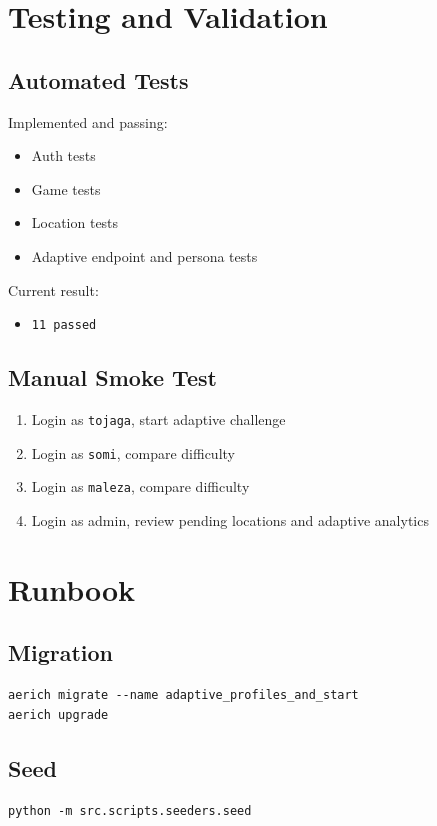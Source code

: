 \documentclass[12pt,a4paper]{article}
\begin{document}
\section{Testing and Validation}
\subsection{Automated Tests}
Implemented and passing:
\begin{itemize}[noitemsep]
  \item Auth tests
  \item Game tests
  \item Location tests
  \item Adaptive endpoint and persona tests
\end{itemize}

Current result:
\begin{itemize}[noitemsep]
  \item \texttt{11 passed}
\end{itemize}

\subsection{Manual Smoke Test}
\begin{enumerate}[noitemsep]
  \item Login as \texttt{tojaga}, start adaptive challenge
  \item Login as \texttt{somi}, compare difficulty
  \item Login as \texttt{maleza}, compare difficulty
  \item Login as admin, review pending locations and adaptive analytics
\end{enumerate}

\section{Runbook}
\subsection{Migration}
\begin{verbatim}
aerich migrate --name adaptive_profiles_and_start
aerich upgrade
\end{verbatim}

\subsection{Seed}
\begin{verbatim}
python -m src.scripts.seeders.seed
\end{verbatim}
\end{document}
